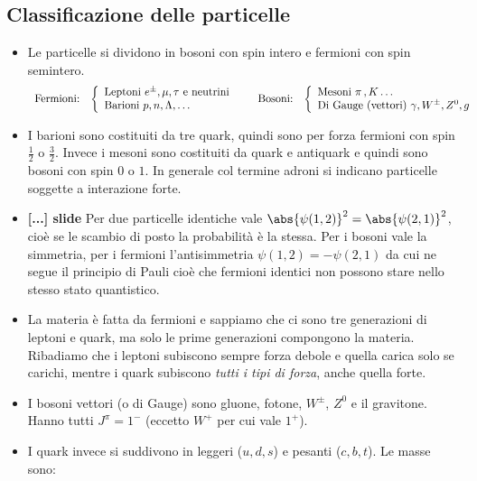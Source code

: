 \subsection{Classificazione delle particelle}
\begin{itemize}
    \item Le particelle si dividono in bosoni con spin intero e fermioni con spin semintero. 
    \[
        \begin{array}{l c c c}
        \text{Fermioni:} & 
        \left\{
        \begin{array}{lll}
        \text{Leptoni } e^\pm,\mu,\tau \text{ e neutrini} \\
        \text{Barioni } p,n,\Lambda,\dots
        \end{array}
        \right.
        & \quad \text{Bosoni:} &
        \left\{
        \begin{array}{lll}
        \text{Mesoni }\pi\,,K\dots \\
        \text{Di Gauge (vettori) } \gamma,W^\pm,Z^0,g
        \end{array}
        \right.
        \end{array}
    \]
    \item I barioni sono costituiti da tre quark, quindi sono per forza fermioni con spin $\frac12$ o $\frac32$. Invece i mesoni sono costituiti da quark e antiquark e quindi sono bosoni con spin $0$ o $1$. In generale col termine adroni si indicano particelle soggette a interazione forte.
    \item \textbf{[...] slide} Per due particelle identiche vale $\abs{\psi(1,2)}^2=\abs{\psi(2,1)}^2$, cioè se le scambio di posto la probabilità è la stessa. Per i bosoni vale la simmetria, per i fermioni l'antisimmetria $\psi(1,2)=-\psi(2,1)$ da cui ne segue il principio di Pauli cioè che fermioni identici non possono stare nello stesso stato quantistico.
    \item La materia è fatta da fermioni e sappiamo che ci sono tre generazioni di leptoni e quark, ma solo le prime generazioni compongono la materia. Ribadiamo che i leptoni subiscono sempre forza debole e quella carica solo se carichi, mentre i quark subiscono \textit{tutti i tipi di forza}, anche quella forte.
    \item I bosoni vettori (o di Gauge) sono gluone, fotone, $W^\pm$, $Z^0$ e il gravitone. Hanno tutti $J^\pi=1^-$ (eccetto $W^+$ per cui vale $1^+$).
    \item I quark invece si suddivono in leggeri ($u,d,s$) e pesanti ($c,b,t$). Le masse sono:
    

\end{itemize}
